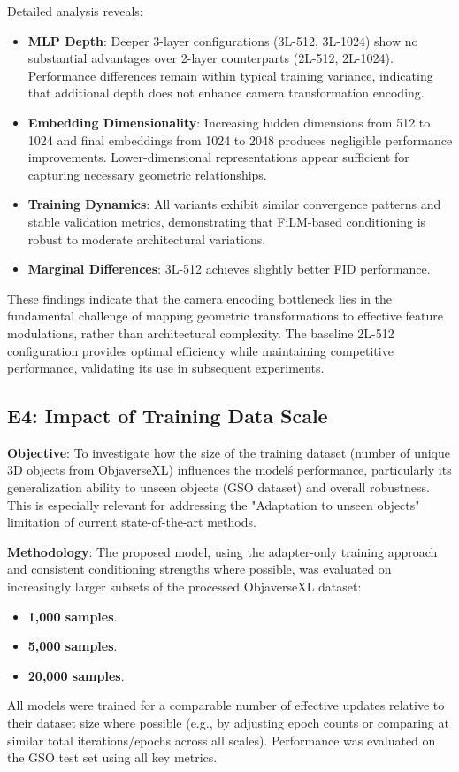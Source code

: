 Detailed analysis reveals:
\begin{itemize}
  \item \textbf{MLP Depth}: Deeper 3-layer configurations (3L-512, 3L-1024) show no substantial advantages over 2-layer counterparts (2L-512, 2L-1024). Performance differences remain within typical training variance, indicating that additional depth does not enhance camera transformation encoding.
  \item \textbf{Embedding Dimensionality}: Increasing hidden dimensions from 512 to 1024 and final embeddings from 1024 to 2048 produces negligible performance improvements. Lower-dimensional representations appear sufficient for capturing necessary geometric relationships.
  \item \textbf{Training Dynamics}: All variants exhibit similar convergence patterns and stable validation metrics, demonstrating that FiLM-based conditioning is robust to moderate architectural variations.
  \item \textbf{Marginal Differences}: 3L-512 achieves slightly better FID performance.
\end{itemize}

These findings indicate that the camera encoding bottleneck lies in the fundamental challenge of mapping geometric transformations to effective feature modulations, rather than architectural complexity. The baseline 2L-512 configuration provides optimal efficiency while maintaining competitive performance, validating its use in subsequent experiments.

\subsection{E4: Impact of Training Data Scale}\label{ssec:exp_data_scale}
\textbf{Objective}: To investigate how the size of the training dataset (number of unique 3D objects from ObjaverseXL) influences the model\'s performance, particularly its generalization ability to unseen objects (GSO dataset) and overall robustness. This is especially relevant for addressing the "Adaptation to unseen objects" limitation of current state-of-the-art methods.

\textbf{Methodology}:
The proposed model, using the adapter-only training approach and consistent conditioning strengths where possible, was evaluated on increasingly larger subsets of the processed ObjaverseXL dataset:
\begin{itemize}
  \item \textbf{1,000 samples}.
  \item \textbf{5,000 samples}.
  \item \textbf{20,000 samples}.
\end{itemize}
All models were trained for a comparable number of effective updates relative to their dataset size where possible (e.g., by adjusting epoch counts or comparing at similar total iterations/epochs across all scales). Performance was evaluated on the GSO test set using all key metrics.

